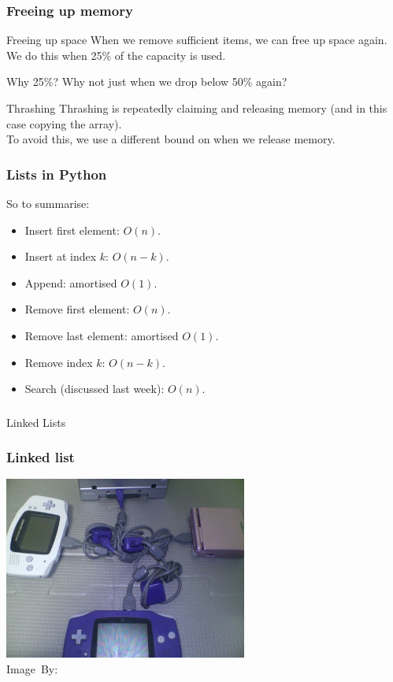 \begin{frame}
	\frametitle{Freeing up memory}
	\begin{block}{Freeing up space}
		When we remove sufficient items, we can free up space again.\\
		We do this when 25\% of the capacity is used.
	\end{block}	
	\pause
	\begin{block}{Why 25\%?}
		Why not just when we drop below 50\% again?
	\end{block}
	\pause
	\begin{block}{Thrashing}
		Thrashing is repeatedly claiming and releasing memory (and in this case copying the array).\\
		To avoid this, we use a different bound on when we release memory.
	\end{block}
\end{frame}

\begin{frame}
	\frametitle{Lists in Python}
	So to summarise:
	\begin{itemize}
		\item Insert first element: $O(n)$.
		\item Insert at index $k$: $O(n-k)$.
		\item Append: amortised $O(1)$.
		\item Remove first element: $O(n)$.
		\item Remove last element: amortised $O(1)$.
		\item Remove index $k$: $O(n-k)$.
		\item Search (discussed last week): $O(n)$.
	\end{itemize}
\end{frame}

\begin{frame}[fragile]\frametitle{}
\begin{center}
{\Large Linked Lists}
\end{center}

\end{frame}

\begin{frame}
	\frametitle{Linked list}
	\begin{center}
		\includegraphics[width=0.6\textwidth]{images/gba.jpg}\\
		\hspace*{15pt}\hbox{\scriptsize Image By:}
	\end{center}
\end{frame}

